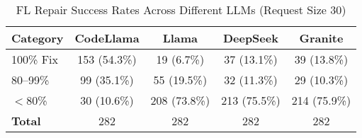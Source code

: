 \begin{table}[t]
\centering
\caption{FL Repair Success Rates Across Different LLMs (Request Size 30)}
\label{tab:fl_llm_comparison}
\footnotesize
\setlength{\tabcolsep}{4pt}
\begin{tabular}{lcccc}
\toprule
\textbf{Category} & \textbf{CodeLlama} & \textbf{Llama} & \textbf{DeepSeek} & \textbf{Granite} \\
\midrule
100\% Fix & 153 (54.3\%) & 19 (6.7\%) & 37 (13.1\%) & 39 (13.8\%) \\
80--99\% & 99 (35.1\%) & 55 (19.5\%) & 32 (11.3\%) & 29 (10.3\%) \\
$<$80\% & 30 (10.6\%) & 208 (73.8\%) & 213 (75.5\%) & 214 (75.9\%) \\
\midrule
\textbf{Total} & 282 & 282 & 282 & 282 \\
\bottomrule
\end{tabular}
\end{table}
